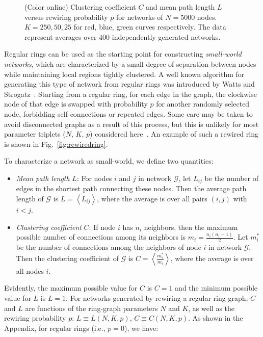\begin{figure}[b]
\begin{minipage}[t]{0.62\textwidth}
        \caption{\label{fig:small-world} (Color online) Clustering coefficient $C$ and mean path length $L$ versus rewiring probability
        $p$ for networks of $N=5000$ nodes.  $K=250, 50, 25$ for red, blue, green curves respectively. The data represent averages over
    400 independently generated networks.  }
    \end{minipage}
\end{figure}

Regular rings can be used as the starting point for constructing \textit{small-world networks}, which are characterized by a small degree
of separation between nodes while maintaining local regions tightly clustered. A well known algorithm for generating this type of
network from regular rings was introduced by Watts and Strogatz~\cite{watts1998collective}. Starting from a regular ring, for each edge
in the graph, the clockwise node of that edge is swapped with probability $p$ for another randomly selected node, forbidding
self-connections or repeated edges. Some care may be taken to avoid disconnected graphs as a result of this process, but this is
unlikely for most parameter triplets ($N$, $K$, $p$) considered here~\cite{watts1998collective}. An example of such a rewired ring is
shown in Fig.~\ref{fig:rewiredring}.

To characterize a network as small-world, we define two quantities:

\begin{itemize}
    \item \textit{Mean path length} $L$: For nodes $i$ and $j$ in network $\mathcal{G}$, let $L_{ij}$ be the number of edges in the
        shortest path connecting these nodes.  Then the average path length of $\mathcal{G}$ is $L=\left<L_{ij} \right>$, where the
        average is over all pairs $(i,j)$ with $i<j$.
    \item \textit{Clustering coefficient} $C$: If node $i$ has $n_i$ neighbors, then the maximum possible number of connections among
        its neighbors is $m_i=\frac{n_i(n_i-1)}{2}$. Let $m^*_i$ be the number of connections among the neighbors of node $i$ in
        network $\mathcal{G}$. Then the clustering coefficient of $\mathcal{G}$ is $C=\left< \frac{m^*_i}{m_i} \right>$, where the average is
        over all nodes $i$.
\end{itemize}

Evidently, the maximum possible value for $C$ is $C=1$ and the minimum possible value for $L$ is $L=1$. For networks generated by
rewiring a regular ring graph, $C$ and $L$ are functions of the ring-graph parameters $N$ and $K$, as well as the rewiring probability
$p$: $L\equiv L(N,K,p)$, $C\equiv C(N,K,p)$. As shown in the Appendix, for regular rings (i.e., $p=0$), we have:

